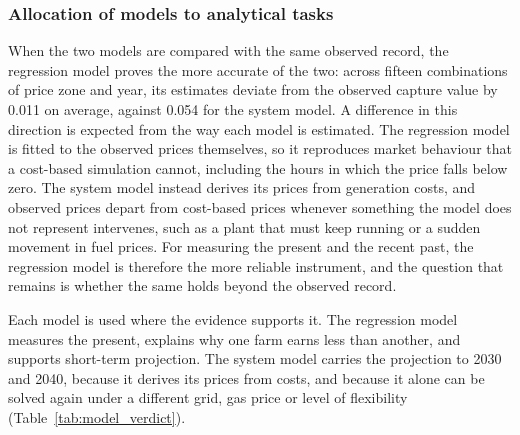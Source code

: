 \subsubsection{Allocation of models to analytical tasks}\label{sec:division}

When the two models are compared with the same observed record, the regression
model proves the more accurate of the two: across fifteen combinations of
price zone and year, its estimates deviate from the observed capture value by
0.011 on average, against 0.054 for the system model. A difference in this
direction is expected from the way each model is estimated. The regression
model is fitted to the observed prices themselves, so it reproduces market
behaviour that a cost-based simulation cannot, including the hours in which
the price falls below zero. The system model instead derives its prices from
generation costs, and observed prices depart from cost-based prices whenever
something the model does not represent intervenes, such as a plant that must
keep running or a sudden movement in fuel prices. For measuring the present
and the recent past, the regression model is therefore the more reliable
instrument, and the question that remains is whether the same holds beyond the
observed record.

Each model
is used where the evidence supports it. The regression model measures
the present, explains why one farm earns less than another, and supports
short-term projection. The system model carries the projection to 2030 and 2040,
because it derives its prices from costs, and because it
alone can be solved again under a different grid, gas price or level of
flexibility (Table~\ref{tab:model_verdict}).

